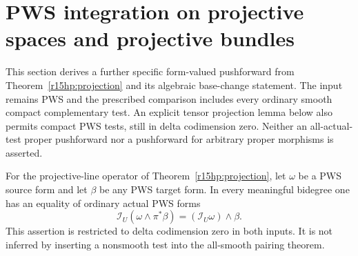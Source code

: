 \section{PWS integration on projective spaces and projective bundles}
\label{r15ps:section}

This section derives a further specific form-valued pushforward
from Theorem~\ref{r15hp:projection} and its algebraic base-change
statement.  The input remains PWS and the prescribed comparison
includes every ordinary smooth compact complementary test.
An explicit tensor projection lemma below also permits compact
PWS tests, still in delta codimension zero.
Neither an all-actual-test proper pushforward nor a pushforward
for arbitrary proper morphisms is asserted.

\begin{lemma}
\label{r15ps:PWS-projection-line}
For the projective-line operator of
Theorem~\ref{r15hp:projection}, let $\omega$ be a PWS source
form and let $\beta$ be any PWS target form.  In every meaningful
bidegree one has an equality of ordinary actual PWS forms
\[
 \mathcal I_U(\omega\wedge\pi^*\beta)
                         =(\mathcal I_U\omega)\wedge\beta.
\tag{PS15.0}\label{r15ps:PWS-projection-formula-line}
\]
This assertion is restricted to delta codimension zero in both
inputs.  It is not inferred by inserting a nonsmooth test into
the all-smooth pairing theorem.
\end{lemma}

